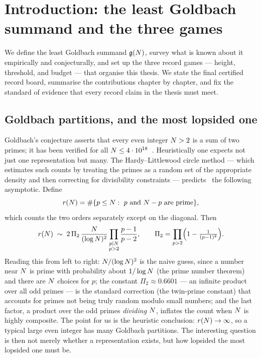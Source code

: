 \chapter{Introduction: the least Goldbach summand and the three games}
\label{ch:intro}

\begin{chapterabstract}
We define the least Goldbach summand $\mathfrak{g}(N)$, survey what is known about
it empirically and conjecturally, and set up the three record games ---
height, threshold, and budget --- that organise this thesis. We state the
final certified record board, summarise the contributions chapter by
chapter, and fix the standard of evidence that every record claim in the
thesis must meet.
\end{chapterabstract}

\section{Goldbach partitions, and the most lopsided one}

Goldbach's conjecture asserts that every even integer $N>2$ is a sum of
two primes; it has been verified for all $N\le4\cdot10^{18}$~\cite{OeS}.
Heuristically one expects not just one representation but many. The
Hardy--Littlewood circle method --- which estimates such counts by
treating the primes as a random set of the appropriate density and then
correcting for divisibility constraints --- predicts~\cite{HL} the
following asymptotic. Define
\[
r(\N)=\#\{p\le\N:\ p\text{ and }\N-p\text{ are prime}\},
\]
which counts the two orders separately except on the diagonal. Then
\begin{equation}\label{eq:HL}
r(N)\;\sim\;2\,\Pi_2\,\frac{N}{(\log N)^2}\prod_{\substack{p\mid N\\ p>2}}\frac{p-1}{p-2},
\qquad
\Pi_2=\prod_{p>2}\Bigl(1-\tfrac{1}{(p-1)^2}\Bigr).
\end{equation}
Reading this from left to right: $N/(\log N)^2$ is the naive guess,
since a number near $N$ is prime with probability about $1/\log N$ (the
prime number theorem) and there are $N$ choices for $p$; the constant
$\Pi_2\approx0.6601$ --- an infinite product over all odd primes --- is
the standard correction (the twin-prime constant) that accounts for
primes not being truly random modulo small numbers; and the last factor,
a product over the odd primes \emph{dividing} $N$, inflates the count
when $N$ is highly composite. The point for us is the heuristic
conclusion: $r(N)\to\infty$, so a typical large even integer has many
Goldbach partitions. The interesting question is then not merely whether
a representation exists, but how lopsided the most lopsided one must be.

